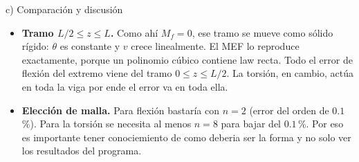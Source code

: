 \begin{desarrollo}{c) Comparación y discusión}
\begin{itemize}[itemsep=4pt]
    \item \textbf{Tramo $L/2\le z\le L$.} Como ahí $M_f=0$, ese tramo se mueve
    como sólido rígido: $\theta$ es constante y $v$ crece linealmente. El
    MEF lo reproduce exactamente, porque un polinomio cúbico contiene law
    recta. Todo el error de flexión del extremo viene del tramo
    $0\le z\le L/2$. La torsión, en cambio, actúa en toda la viga por ende el error va en toda ella.

    \item \textbf{Elección de malla.} Para flexión bastaría con $n=2$ (error
    del orden de $0.1$\,\%). Para la torsión se necesita al menos $n=8$ para
    bajar del $0.1$\,\%. Por eso es importante tener conociemiento de como deberia ser la forma y no solo ver los resultados del programa.
    
\end{itemize}

\end{desarrollo}
